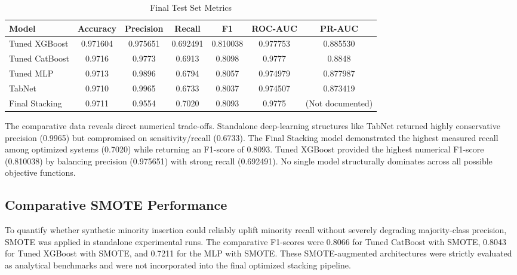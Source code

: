 \documentclass[conference]{IEEEtran}
\begin{document}
\begin{table}[htbp]
\caption{Final Test Set Metrics}
\begin{center}
\begin{tabular}{|l|c|c|c|c|c|c|}
\hline
\textbf{Model} & \textbf{Accuracy} & \textbf{Precision} & \textbf{Recall} & \textbf{F1} & \textbf{ROC-AUC} & \textbf{PR-AUC} \\
\hline
Tuned XGBoost & 0.971604 & 0.975651 & 0.692491 & 0.810038 & 0.977753 & 0.885530 \\ \hline
Tuned CatBoost & 0.9716 & 0.9773 & 0.6913 & 0.8098 & 0.9777 & 0.8848 \\ \hline
Tuned MLP & 0.9713 & 0.9896 & 0.6794 & 0.8057 & 0.974979 & 0.877987 \\ \hline
TabNet & 0.9710 & 0.9965 & 0.6733 & 0.8037 & 0.974507 & 0.873419 \\ \hline
Final Stacking & 0.9711 & 0.9554 & 0.7020 & 0.8093 & 0.9775 & (Not documented) \\ \hline
\end{tabular}
\label{tab2}
\end{center}
\end{table}

The comparative data reveals direct numerical trade-offs. Standalone deep-learning structures like TabNet returned highly conservative precision (0.9965) but compromised on sensitivity/recall (0.6733). The Final Stacking model demonstrated the highest measured recall among optimized systems (0.7020) while returning an F1-score of 0.8093. Tuned XGBoost provided the highest numerical F1-score (0.810038) by balancing precision (0.975651) with strong recall (0.692491). No single model structurally dominates across all possible objective functions.


\subsection{Comparative SMOTE Performance}
To quantify whether synthetic minority insertion could reliably uplift minority recall without severely degrading majority-class precision, SMOTE was applied in standalone experimental runs. The comparative F1-scores were 0.8066 for Tuned CatBoost with SMOTE, 0.8043 for Tuned XGBoost with SMOTE, and 0.7211 for the MLP with SMOTE. These SMOTE-augmented architectures were strictly evaluated as analytical benchmarks and were not incorporated into the final optimized stacking pipeline.
\end{document}
